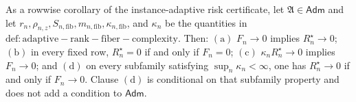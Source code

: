 As a rowwise corollary of the instance-adaptive risk certificate, let \(\mathfrak A\in\mathsf{Adm}\) and let \(r_n,\rho_{n,z},S_{n,\mathrm{fib}},m_{n,\mathrm{fib}},\kappa_{n,\mathrm{fib}}\), and \(\kappa_n\) be the quantities in \(\mathrm{def:adaptive-rank-fiber-complexity}\).  Then: \(\mathrm{(a)}\) \(F_n\to0\) implies \(R_n^{\star}\to0\); \(\mathrm{(b)}\) in every fixed row, \(R_n^{\star}=0\) if and only if \(F_n=0\); \(\mathrm{(c)}\) \(\kappa_nR_n^{\star}\to0\) implies \(F_n\to0\); and \(\mathrm{(d)}\) on every subfamily satisfying \(\sup_n\kappa_n<\infty\), one has \(R_n^{\star}\to0\) if and only if \(F_n\to0\).  Clause \(\mathrm{(d)}\) is conditional on that subfamily property and does not add a condition to \(\mathsf{Adm}\).